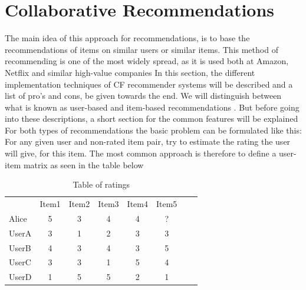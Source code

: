 \section{Collaborative Recommendations}
\label{sec:collaborative}
The main idea of this approach for recommendations, is to base the recommendations of items on similar users or similar items.\newline
This method of recommending is one of the most widely spread, as it is used both at Amazon, Netflix and similar high-value companies \citep{AmazonReommendations}  \newline
In this section, the different implementation techniques of CF recommender systems will be described and a list of pro's and cons, be given towards the end. We will distinguish between what is known as user-based and item-based recommendations . But before going into these descriptions, a short section for the common features will be explained\newline
For both types of recommendations the basic problem can be formulated like this: For any given user and non-rated item pair, try to estimate the rating the user will give, for this item.\newline
The most common approach is therefore to define a user-item matrix as seen in the table below 


\begin{table}[H]
\begin{center}
\begin{tabular}{l c c c c c c r }
  & Item1 & Item2 & Item3 & Item4 & Item5 \\ 
 Alice & 5 & 3 & 4 & 4 & ? \\
 UserA & 3 & 1 & 2 & 3 & 3 \\
 UserB & 4 & 3 & 4 & 3 & 5 \\
 UserC & 3 & 3 & 1 & 5 & 4 \\
 UserD & 1 & 5 & 5 & 2 & 1
\end{tabular}
\caption{Table of ratings}
\label{tableofratings} 
\end{center}
\end{table}



